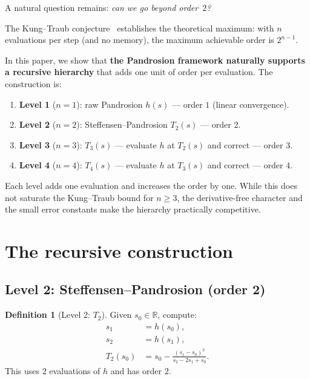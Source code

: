 \documentclass[11pt,a4paper]{article}
\theoremstyle{definition}
\newtheorem{definition}{Definition}[section]
\newcommand{\RR}{\mathbb{R}}
\begin{document}
A natural question remains: \emph{can we go beyond order~$2$?}

\medskip

The Kung--Traub conjecture~\cite{kungtraub} establishes the theoretical maximum: with $n$ evaluations per step (and no memory), the maximum achievable order is $2^{n-1}$.

\medskip

In this paper, we show that \textbf{the Pandrosion framework naturally supports a recursive hierarchy} that adds one unit of order per evaluation.  The construction is:
\begin{enumerate}
  \item \textbf{Level 1} ($n=1$): raw Pandrosion $h(s)$ --- order $1$ (linear convergence).
  \item \textbf{Level 2} ($n=2$): Steffensen--Pandrosion $T_2(s)$ --- order $2$.
  \item \textbf{Level 3} ($n=3$): $T_3(s)$ --- evaluate $h$ at $T_2(s)$ and correct --- order $3$.
  \item \textbf{Level 4} ($n=4$): $T_4(s)$ --- evaluate $h$ at $T_3(s)$ and correct --- order $4$.
\end{enumerate}
Each level adds one evaluation and increases the order by one.  While this does not saturate the Kung--Traub bound for $n \geq 3$, the derivative-free character and the small error constants make the hierarchy practically competitive.

\section{The recursive construction}
\label{sec:construction}

\subsection{Level 2: Steffensen--Pandrosion (order 2)}

\begin{definition}[Level 2: $T_2$]
Given $s_0 \in \RR$, compute:
\begin{align}
  s_1 &= h(s_0), \label{eq:t2_s1} \\
  s_2 &= h(s_1), \label{eq:t2_s2} \\
  T_2(s_0) &= s_0 - \frac{(s_1 - s_0)^2}{s_2 - 2s_1 + s_0}. \label{eq:t2}
\end{align}
This uses $2$ evaluations of $h$ and has order $2$.
\end{definition}
\end{document}
